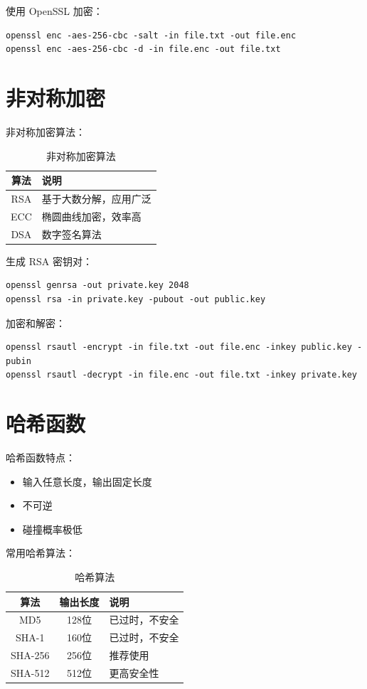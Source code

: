 \documentclass[12pt,UTF8]{ctexbook}
\begin{document}
使用 OpenSSL 加密：
\begin{verbatim}
openssl enc -aes-256-cbc -salt -in file.txt -out file.enc
openssl enc -aes-256-cbc -d -in file.enc -out file.txt
\end{verbatim}

\section{非对称加密}
\label{sec:asymmetric_encryption}

非对称加密算法：
\begin{table}[htbp]
    \centering
    \caption{非对称加密算法}
    \begin{tabular}{|c|p{8cm}|}
        \hline
        \textbf{算法} & \textbf{说明} \\
        \hline
        RSA & 基于大数分解，应用广泛 \\
        \hline
        ECC & 椭圆曲线加密，效率高 \\
        \hline
        DSA & 数字签名算法 \\
        \hline
    \end{tabular}
\end{table}

生成 RSA 密钥对：
\begin{verbatim}
openssl genrsa -out private.key 2048
openssl rsa -in private.key -pubout -out public.key
\end{verbatim}

加密和解密：
\begin{verbatim}
openssl rsautl -encrypt -in file.txt -out file.enc -inkey public.key -pubin
openssl rsautl -decrypt -in file.enc -out file.txt -inkey private.key
\end{verbatim}

\section{哈希函数}
\label{sec:hash_functions}

哈希函数特点：
\begin{itemize}
    \item 输入任意长度，输出固定长度
    \item 不可逆
    \item 碰撞概率极低
\end{itemize}

常用哈希算法：
\begin{table}[htbp]
    \centering
    \caption{哈希算法}
    \begin{tabular}{|c|c|p{5cm}|}
        \hline
        \textbf{算法} & \textbf{输出长度} & \textbf{说明} \\
        \hline
        MD5 & 128位 & 已过时，不安全 \\
        \hline
        SHA-1 & 160位 & 已过时，不安全 \\
        \hline
        SHA-256 & 256位 & 推荐使用 \\
        \hline
        SHA-512 & 512位 & 更高安全性 \\
        \hline
    \end{tabular}
\end{table}
\end{document}
